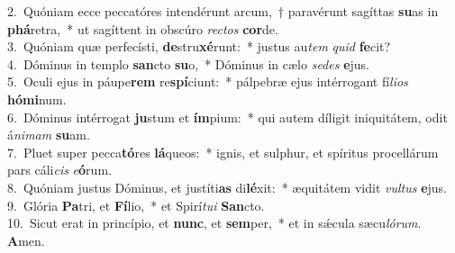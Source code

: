 {2.~}Quóniam ecce peccatóres intendérunt arcum,~† paravérunt sagíttas \textbf{su}as in \textbf{phá}retra,~* ut sagíttent in obscúro \textit{re}\textit{ctos} \textbf{cor}de.\\
{3.~}Quóniam quæ perfecísti, \textbf{de}stru\textbf{xé}runt:~* justus au\textit{tem} \textit{quid} \textbf{fe}cit?\\
{4.~}Dóminus in templo \textbf{san}cto \textbf{su}o,~* Dóminus in cælo \textit{se}\textit{des} \textbf{e}jus.\\
{5.~}Oculi ejus in páupe\textbf{rem} re\textbf{spí}ciunt:~* pálpebræ ejus intérrogant fí\textit{li}\textit{os} \textbf{hó}\textbf{mi}num.\\
{6.~}Dóminus intérrogat \textbf{ju}stum et \textbf{ím}pium:~* qui autem díligit iniquitátem, odit á\textit{ni}\textit{mam} \textbf{su}am.\\
{7.~}Pluet super pecca\textbf{tó}res \textbf{lá}queos:~* ignis, et sulphur, et spíritus procellárum pars cáli\textit{cis} \textit{e}\textbf{ó}rum.\\
{8.~}Quóniam justus Dóminus, et justíti\textbf{as} di\textbf{lé}xit:~* æquitátem vidit \textit{vul}\textit{tus} \textbf{e}jus.\\
{9.~}Glória \textbf{Pa}tri, et \textbf{Fí}lio,~* et Spirí\textit{tu}\textit{i} \textbf{San}cto.\\
{10.~}Sicut erat in princípio, et \textbf{nunc}, et \textbf{sem}per,~* et in sǽcula sæcu\textit{ló}\textit{rum}. \textbf{A}men.\\
